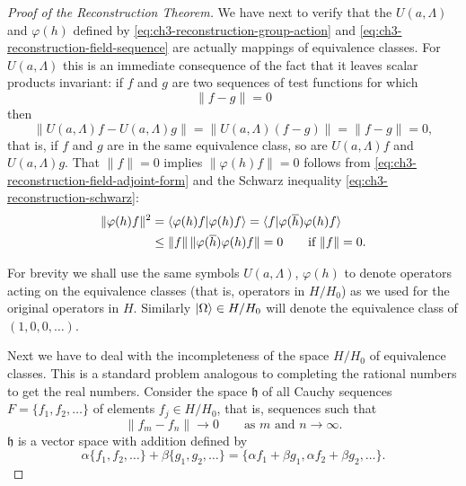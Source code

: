 \begin{proof}[Proof of the Reconstruction Theorem]
We have next to verify that the \(U(a,\Lambda)\) and \(\varphi(h)\) defined
by \eqref{eq:ch3-reconstruction-group-action} and \eqref{eq:ch3-reconstruction-field-sequence} are actually mappings of equivalence classes.  For
\(U(a,\Lambda)\) this is an immediate consequence of the fact that it leaves
scalar products invariant: if \(f\) and \(g\) are two sequences of test
functions for which
\begin{equation*}
\lVert f-g\rVert=0
\end{equation*}
then
\begin{equation*}
\lVert U(a,\Lambda)f-U(a,\Lambda)g\rVert
 =\lVert U(a,\Lambda)(f-g)\rVert=\lVert f-g\rVert=0,
\end{equation*}
that is, if \(f\) and \(g\) are in the same equivalence class, so are
\(U(a,\Lambda)f\) and \(U(a,\Lambda)g\).  That \(\lVert f\rVert=0\) implies
\(\lVert\varphi(h)f\rVert=0\) follows from \eqref{eq:ch3-reconstruction-field-adjoint-form} and the Schwarz
inequality \eqref{eq:ch3-reconstruction-schwarz}:
\begin{equation*}
\begin{aligned}
\lVert\varphi(h)f\rVert^2
 &=\langle \varphi(h)f\vert \varphi(h)f\rangle
  =\langle f\vert \varphi(\overline h)\varphi(h)f\rangle\\
 &\leq \lVert f\rVert\,\lVert\varphi(\overline h)\varphi(h)f\rVert=0
 \qquad\text{if }\lVert f\rVert=0 .
\end{aligned}
\end{equation*}

For brevity we shall use the same symbols \(U(a,\Lambda)\), \(\varphi(h)\) to
denote operators acting on the equivalence classes (that is, operators in
\(H/H_0\)) as we used for the original operators in \(H\).  Similarly
\(\lvert \Omega\rangle\in H/H_0\) will denote the equivalence class of
\((1,0,0,\ldots)\).

Next we have to deal with the incompleteness of the space \(H/H_0\) of
equivalence classes.  This is a standard problem analogous to completing the
rational numbers to get the real numbers.  Consider the space \(\mathfrak h\)
of all Cauchy sequences \(F=\{f_1,f_2,\ldots\}\) of elements
\(f_j\in H/H_0\), that is, sequences such that
\begin{equation*}
\lVert f_m-f_n\rVert\longrightarrow 0
\qquad\text{as }m\text{ and }n\longrightarrow\infty .
\end{equation*}
\(\mathfrak h\) is a vector space with addition defined by
\begin{equation*}
\alpha\{f_1,f_2,\ldots\}+\beta\{g_1,g_2,\ldots\}
 =\{\alpha f_1+\beta g_1,\alpha f_2+\beta g_2,\ldots\} .
\end{equation*}


\end{proof}
